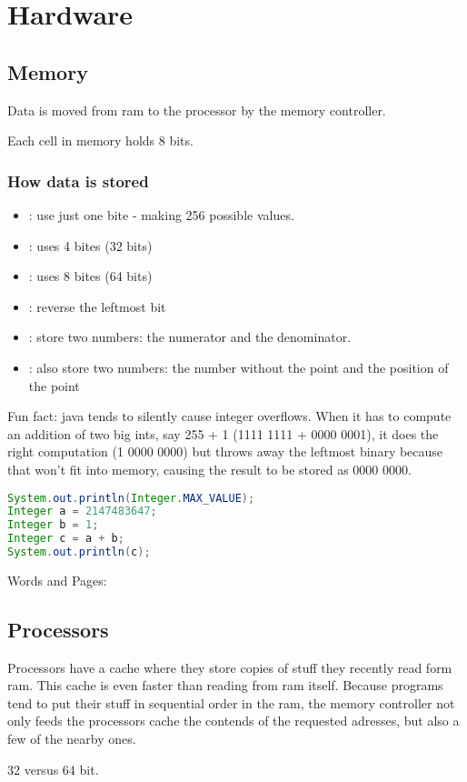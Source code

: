 \section{Hardware}

\subsection{Memory}


Data is moved from ram to the processor by the memory controller. 


Each cell in memory holds 8 bits. 

\subsubsection{How data is stored}

\begin{itemize}
    \item  {}: use just one bite - making 256 possible values. 
   \item  {}: uses 4 bites (32 bits)
   \item  {}: uses 8 bites (64 bits)
   \item  {}: reverse the leftmost bit
   \item  {}: store two numbers: the numerator and the denominator. 
   \item  {}: also store two numbers: the number without the point and the position of the point
\end{itemize}


Fun fact: java tends to silently cause integer overflows. When it has to compute an addition of two big ints, say 255 + 1 (1111 1111 + 0000 0001), it does the right computation (1 0000 0000) but throws away the leftmost binary because that won't fit into memory, causing the result to be stored as 0000 0000. 

\begin{lstlisting}[language=java]
System.out.println(Integer.MAX_VALUE);   
Integer a = 2147483647;
Integer b = 1;
Integer c = a + b;
System.out.println(c);
\end{lstlisting}


Words and Pages:



\subsection{Processors}

Processors have a cache where they store copies of stuff they recently read form ram. This cache is even faster than reading from ram itself. Because programs tend to put their stuff in sequential order in the ram, the memory controller not only feeds the processors cache the contends of the requested adresses, but also a few of the nearby ones. 

32 versus 64 bit.


